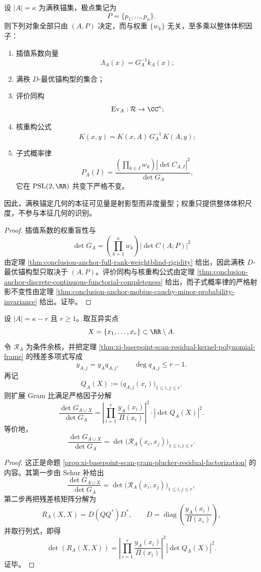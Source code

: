 \begin{theorem}[满秩锚定的射影完备性与权重盲刚性]\label{thm:conclusion-anchor-projective-completeness-weightblind-rigidity}
设 \(|A|=\kappa\) 为满秩锚集，极点集记为
\[
P=\{p_1,\dots,p_\kappa\}.
\]
则下列对象全部只由 \((A,P)\) 决定，而与权重 \(\{w_k\}\) 无关，至多乘以整体体积因子：
\begin{enumerate}
  \item 插值系数向量
  \[
  \Lambda_A(x)=G_A^{-1}k_A(x);
  \]
  \item 满秩 \(D\)-最优锚构型的集合；
  \item 评价同构
  \[
  \operatorname{Ev}_A:\mathcal R\to\CC^\kappa;
  \]
  \item 核重构公式
  \[
  K(x,y)=K(x,A)\,G_A^{-1}\,K(A,y);
  \]
  \item 子式概率律
  \[
  P_A(I)=
  \frac{
  \left(\prod_{k\in I}w_k\right)|\det C_{A,I}|^2
  }{\det G_A},
  \]
  它在 \(\mathrm{PSL}(2,\RR)\) 共变下严格不变。
\end{enumerate}
因此，满秩锚定几何的本征可见量是射影型而非度量型；权重只提供整体体积尺度，不参与本征几何的识别。
\end{theorem}
\begin{proof}
插值系数的权重盲性与
\[
\det G_A=
\left(\prod_{k=1}^{\kappa}w_k\right)|\det C(A;P)|^2
\]
由定理 \ref{thm:conclusion-anchor-full-rank-weightblind-rigidity} 给出，因此满秩 \(D\)-最优锚构型只取决于 \((A,P)\)。评价同构与核重构公式由定理 \ref{thm:conclusion-anchor-discrete-continuous-functorial-completeness} 给出，而子式概率律的严格射影不变性由定理 \ref{thm:conclusion-anchor-mobius-cauchy-minor-probability-invariance} 给出。证毕。
\end{proof}

\begin{theorem}\label{thm:conclusion-anchor-residual-plucker-volume}
设 \(|A|=\kappa-r\) 且 \(r\ge 1\)。取互异实点
\[
X=\{x_1,\dots,x_r\}\subset \RR\setminus A.
\]
令 \(\mathcal R_A\) 为条件余核，并把定理 \ref{thm:xi-basepoint-scan-residual-kernel-polynomial-frame} 的残差多项式写成
\[
y_{A,j}=y_A q_{A,j},
\qquad
\deg q_{A,j}\le r-1.
\]
再记
\[
Q_A(X):=\bigl(q_{A,j}(x_i)\bigr)_{1\le i,j\le r}.
\]
则扩展 Gram 比满足严格因子分解
\[
\frac{\det G_{A\cup X}}{\det G_A}
=
\left|
\prod_{i=1}^{r}\frac{y_A(x_i)}{\Pi(x_i)}
\right|^2\cdot
|\det Q_A(X)|^2.
\]
等价地，
\[
\frac{\det G_{A\cup X}}{\det G_A}
=
\det\bigl(\mathcal R_A(x_i,x_j)\bigr)_{1\le i,j\le r}.
\]
\end{theorem}
\begin{proof}
这正是命题 \ref{prop:xi-basepoint-scan-gram-plucker-residual-factorization} 的内容。其第一步由 Schur 补给出
\[
\frac{\det G_{A\cup X}}{\det G_A}
=
\det\bigl(\mathcal R_A(x_i,x_j)\bigr)_{1\le i,j\le r},
\]
第二步再把残差核矩阵分解为
\[
R_A(X,X)=D(QQ^\ast)D^\ast,
\qquad
D=\operatorname{diag}\!\left(\frac{y_A(x_i)}{\Pi(x_i)}\right),
\]
并取行列式，即得
\[
\det(R_A(X,X))
=
\left|
\prod_{i=1}^{r}\frac{y_A(x_i)}{\Pi(x_i)}
\right|^2 |\det Q_A(X)|^2.
\]
证毕。
\end{proof}


